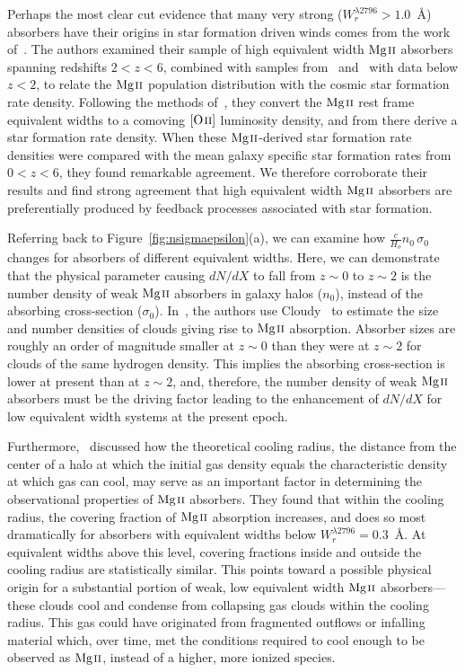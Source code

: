 \documentclass[iop,apj,numberedappendix,appendixfloats,twocolappendix]{emulateapj}
\begin{document}
Perhaps the most clear cut evidence that many very strong ($W_r^{\lambda2796} > 1.0$~{\AA}) absorbers have their origins in star formation driven winds comes from the work of~\cite{Matejek2012}. The authors examined their sample of high equivalent width ${\hbox{{\rm Mg}\kern 0.1em{\sc ii}}}$ absorbers spanning redshifts $2 < z < 6$, combined with samples from~\cite{Nestor2005} and~\cite{Prochter2006} with data below $z < 2$, to relate the ${\hbox{{\rm Mg}\kern 0.1em{\sc ii}}}$ population distribution with the cosmic star formation rate density. Following the methods of~\cite{Menard2011}, they convert the ${\hbox{{\rm Mg}\kern 0.1em{\sc ii}}}$ rest frame equivalent widths to a comoving ${\hbox{[{\rm O}\kern 0.1em{\sc ii}]}}$ luminosity density, and from there derive a star formation rate density. When these ${\hbox{{\rm Mg}\kern 0.1em{\sc ii}}}$-derived star formation rate densities were compared with the mean galaxy specific star formation rates from $0 < z < 6$, they found remarkable agreement. We therefore corroborate their results and find strong agreement that high equivalent width ${\hbox{{\rm Mg}\kern 0.1em{\sc ii}}}$ absorbers are preferentially produced by feedback processes associated with star formation. 

Referring back to Figure~\ref{fig:nsigmaepsilon}(a), we can examine how $\frac{c}{H_o}n_0\,\sigma_0$ changes for absorbers of different equivalent widths. Here, we can demonstrate that the physical parameter causing $dN\!/dX$ to fall from $z \sim 0$ to $z \sim 2$ is the number density of weak ${\hbox{{\rm Mg}\kern 0.1em{\sc ii}}}$ absorbers in galaxy halos ($n_0$), instead of the absorbing cross-section ($\sigma_0$). In~\cite{Evans2013}, the authors use Cloudy~\citep{Ferland2013} to estimate the size and number densities of clouds giving rise to ${\hbox{{\rm Mg}\kern 0.1em{\sc ii}}}$ absorption. Absorber sizes are roughly an order of magnitude smaller at $z \sim 0$ than they were at $z \sim 2$ for clouds of the same hydrogen density. This implies the absorbing cross-section is lower at present than at $z \sim 2$, and, therefore, the number density of weak ${\hbox{{\rm Mg}\kern 0.1em{\sc ii}}}$ absorbers must be the driving factor leading to the enhancement of $dN\!/dX$ for low equivalent width systems at the present epoch. 

Furthermore,~\cite{MAGIICAT3} discussed how the theoretical cooling radius, the distance from the center of a halo at which the initial gas density equals the characteristic density at which gas can cool, may serve as an important factor in determining the observational properties of ${\hbox{{\rm Mg}\kern 0.1em{\sc ii}}}$ absorbers. They found that within the cooling radius, the covering fraction of ${\hbox{{\rm Mg}\kern 0.1em{\sc ii}}}$ absorption increases, and does so most dramatically for absorbers with equivalent widths below $W_r^{\lambda2796} = 0.3$~{\AA}. At equivalent widths above this level, covering fractions inside and outside the cooling radius are statistically similar. This points toward a possible physical origin for a substantial portion of weak, low equivalent width ${\hbox{{\rm Mg}\kern 0.1em{\sc ii}}}$ absorbers---these clouds cool and condense from collapsing gas clouds within the cooling radius. This gas could have originated from fragmented outflows or infalling material which, over time, met the conditions required to cool enough to be observed as ${\hbox{{\rm Mg}\kern 0.1em{\sc ii}}}$, instead of a higher, more ionized species. 
\end{document}
